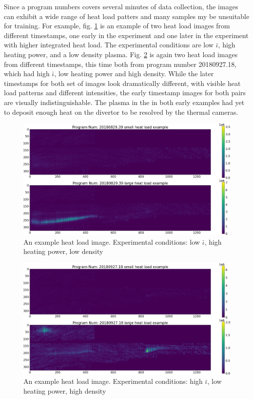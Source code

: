\label{sec:Data Selection}

Since a program numbers covers several minutes of data collection, the images can exhibit a wide range of heat load patters and many samples my be unsuitable for training. For example, fig. \ref{fig:data:heat_load1} is an example of two heat load images from different timestamps, one early in the experiment and one later in the experiment with higher integrated heat load. The experimental conditions are low $\bar{\iota}$, high heating power, and a low density plasma. Fig. \ref{fig:data:heat_load2} is again two heat load images from different timestamps, this time both from program number 20180927.18, which had high $\bar{\iota}$, low heating power and high density. While the later timestamps for both set of images look dramatically different, with visible heat load patterns and different intensities, the early timestamp images for both pairs are visually indistinguishable. The plasma in the in both early examples had yet to deposit enough heat on the divertor to be resolved by the thermal cameras.

\begin{figure}[htb]
	\includegraphics[width=\textwidth]{images/heat_load1.png}
	\caption{An example heat load image. Experimental conditions: low $\bar{\iota}$, high heating power, low density}
	\label{fig:data:heat_load1}
\end{figure}

\begin{figure}[htb]
	\includegraphics[width=\textwidth]{images/heat_load2.png}
	\caption{An example heat load image. Experimental conditions: high $\bar{\iota}$, low heating power, high density}
	\label{fig:data:heat_load2}
\end{figure}

